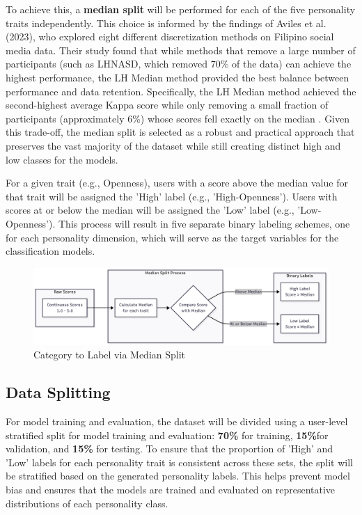 To achieve this, a \textbf{median split} will be performed for each of the five personality traits independently. This choice is informed by the findings of Aviles et al. (2023), who explored eight different discretization methods on Filipino social media data. Their study found that while methods that remove a large number of participants (such as LHNASD, which removed 70\% of the data) can achieve the highest performance, the LH Median method provided the best balance between performance and data retention. Specifically, the LH Median method achieved the second-highest average Kappa score while only removing a small fraction of participants (approximately 6\%) whose scores fell exactly on the median \citep{aviles2023}. Given this trade-off, the median split is selected as a robust and practical approach that preserves the vast majority of the dataset while still creating distinct high and low classes for the models.

For a given trait (e.g., Openness), users with a score above the median value for that trait will be assigned the 'High' label (e.g., 'High-Openness'). Users with scores at or below the median will be assigned the 'Low' label (e.g., 'Low-Openness'). This process will result in five separate binary labeling schemes, one for each personality dimension, which will serve as the target variables for the classification models.

\begin{figure}[H]
	\centering
	\includegraphics[width=1\textwidth]{"figures/Scores.png"}
	\caption{Category to Label via Median Split}
	\label{fig:median_split_diagram}
\end{figure}


\subsection{Data Splitting}
For model training and evaluation, the dataset will be divided using a user-level stratified split for model training and evaluation: \textbf{70\%} for training, \textbf{15\%}for validation, and \textbf{15\%} for testing. To ensure that the proportion of 'High' and 'Low' labels for each personality trait is consistent across these sets, the split will be stratified based on the generated personality labels. This helps prevent model bias and ensures that the models are trained and evaluated on representative distributions of each personality class.

